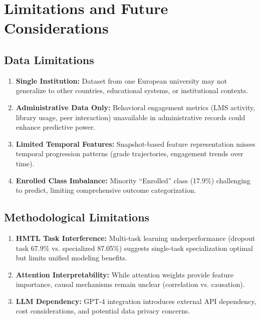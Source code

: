 \section{Limitations and Future Considerations}

\subsection{Data Limitations}

\begin{enumerate}
\item \textbf{Single Institution:} Dataset from one European university may not generalize to other countries, educational systems, or institutional contexts.

\item \textbf{Administrative Data Only:} Behavioral engagement metrics (LMS activity, library usage, peer interaction) unavailable in administrative records could enhance predictive power.

\item \textbf{Limited Temporal Features:} Snapshot-based feature representation misses temporal progression patterns (grade trajectories, engagement trends over time).

\item \textbf{Enrolled Class Imbalance:} Minority ``Enrolled'' class (17.9\%) challenging to predict, limiting comprehensive outcome categorization.
\end{enumerate}

\subsection{Methodological Limitations}

\begin{enumerate}
\item \textbf{HMTL Task Interference:} Multi-task learning underperformance (dropout task 67.9\% vs. specialized 87.05\%) suggests single-task specialization optimal but limits unified modeling benefits.

\item \textbf{Attention Interpretability:} While attention weights provide feature importance, causal mechanisms remain unclear (correlation vs. causation).

\item \textbf{LLM Dependency:} GPT-4 integration introduces external API dependency, cost considerations, and potential data privacy concerns.
\end{enumerate}

